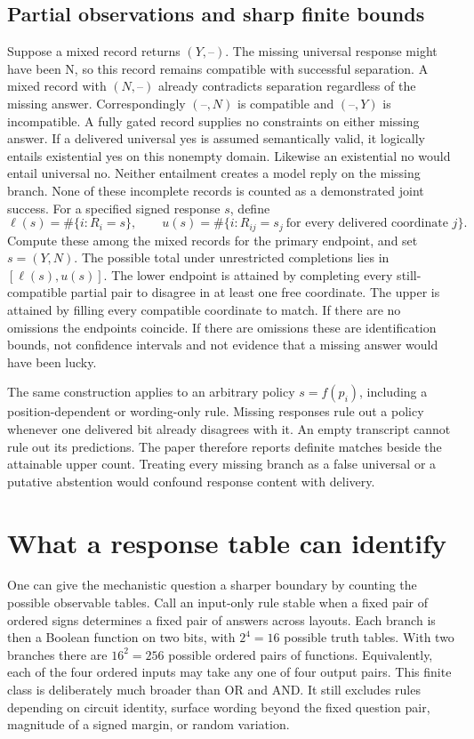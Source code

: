 \documentclass[12pt,letterpaper]{article}
\begin{document}
\subsection{Partial observations and sharp finite bounds}
Suppose a mixed record returns $(Y,\text{--})$. The missing universal response might have been N, so this record remains compatible with successful separation. A mixed record with $(N,\text{--})$ already contradicts separation regardless of the missing answer. Correspondingly $(\text{--},N)$ is compatible and $(\text{--},Y)$ is incompatible. A fully gated record supplies no constraints on either missing answer. If a delivered universal yes is assumed semantically valid, it logically entails existential yes on this nonempty domain. Likewise an existential no would entail universal no. Neither entailment creates a model reply on the missing branch. None of these incomplete records is counted as a demonstrated joint success.
For a specified signed response $s$, define
\[
 \ell(s)=\#\{i:R_i=s\},\qquad
 u(s)=\#\{i:R_{ij}=s_j\ \text{for every delivered coordinate }j\}.
\]
Compute these among the mixed records for the primary endpoint, and set $s=(Y,N)$. The possible total under unrestricted completions lies in $[\ell(s),u(s)]$. The lower endpoint is attained by completing every still-compatible partial pair to disagree in at least one free coordinate. The upper is attained by filling every compatible coordinate to match. If there are no omissions the endpoints coincide. If there are omissions these are identification bounds, not confidence intervals and not evidence that a missing answer would have been lucky.

The same construction applies to an arbitrary policy $s=f(p_i)$, including a position-dependent or wording-only rule. Missing responses rule out a policy whenever one delivered bit already disagrees with it. An empty transcript cannot rule out its predictions. The paper therefore reports definite matches beside the attainable upper count. Treating every missing branch as a false universal or a putative abstention would confound response content with delivery.


\section{What a response table can identify}
One can give the mechanistic question a sharper boundary by counting the possible observable tables. Call an input-only rule stable when a fixed pair of ordered signs determines a fixed pair of answers across layouts. Each branch is then a Boolean function on two bits, with $2^4=16$ possible truth tables. With two branches there are $16^2=256$ possible ordered pairs of functions. Equivalently, each of the four ordered inputs may take any one of four output pairs. This finite class is deliberately much broader than OR and AND. It still excludes rules depending on circuit identity, surface wording beyond the fixed question pair, magnitude of a signed margin, or random variation.
\end{document}
